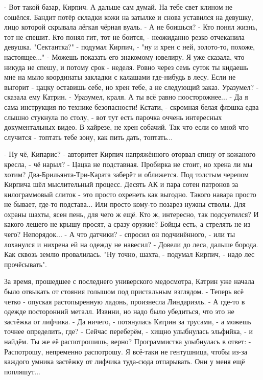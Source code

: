 

 - Вот такой базар, Кирпич. А дальше сам думай. На тебе свет клином не сошёлся.
Бандит потёр складки кожи на затылке и снова уставился на девушку, лицо которой скрывала лёгкая чёрная вуаль.
 - А не боишься?
 - Кто понял жизнь, тот не спешит. Кто понял гит, тот не боится, - неожиданно резко отчеканила девушка.
"Сектантка?" - подумал Кирпич, - "ну и хрен с ней, золото-то, похоже, настоящее..."
 - Можешь показать его знакомому ювелиру. Я уже сказала, что никуда не спешу, и потому срок - неделя. Ровно через семь суток ты кидаешь мне на мыло координаты закладки с калашами где-нибудь в лесу. Если не выгорит - цацку оставишь себе, но хрен тебе, а не следующий заказ. Уразумел? - сказала ему Катрин.
 - Уразумел, краля. А ты всё равно поосторожнее...
 - Да я сама инструкция по технике безопасности! Кстати, - скромная белая флэшка едва слышно стукнула по столу, - вот тут есть парочка оччень интересных документальных видео. В хайрезе, не хрен собачий. Так что если со мной что случится - топтать тебе зону, как пить дать, топтать...



 - Ну чё, Кипарис? - авторитет Кирпич напряжённого оторвал спину от кожаного кресла, - чё нарыл?
 - Цацка не подставная. Пробирка не стоит, но хрена ли мы хотим? Два-Брильянта-Три-Карата заберёт и оближется.
Под толстым черепом Кирпича шёл мыслительный процесс. Десять АК и пара сотен патронов за килограммовый слиток - это просто охренеть как выгодно. Такого навара просто не бывает, где-то подстава... Или просто кому-то позарез нужны стволы. Для охраны шахты, ясен пень, для чего ж ещё. Кто ж, интересно, так подсуетился? И какого лешего не крышу просят, а сразу оружие? Бойцы есть, а стрелять не из чего? Непорядок...
 - А что датчики? - спросил он подчинённого, - или ты лоханулся и нихрена ей на одежду не навесил?
 - Довели до леса, дальше борода. Как сквозь землю провалилась.
"Ну точно, шахта, - подумал Кирпич, - надо лес прочёсывать".



За время, прошедшее с последнего универского медосмотра, Катрин уже начала было отвыкать от стояния голышом под пристальным взглядом.
 - Теперь всё четко - опуская растопыренную ладонь, произнесла Линдариэль. - А где-то в одежде посторонний металл. Извини, но надо было убедиться, что это не застёжка от лифчика.
 - Да ничего, - потянулась Катрин за трусами, - а можешь точнее определить, где?
 - Сейчас переберём, - хищно улыбнулась эльфийка, - и найдём. Ты же её распотрошишь, верно?
Программистка улыбнулась в ответ:
 - Распотрошу, непременно распотрошу. Я всё-таки не гентушница, чтобы из-за каждого умника застёжку от лифчика туда-сюда отпарывать. Они у меня ещё попляшут...


